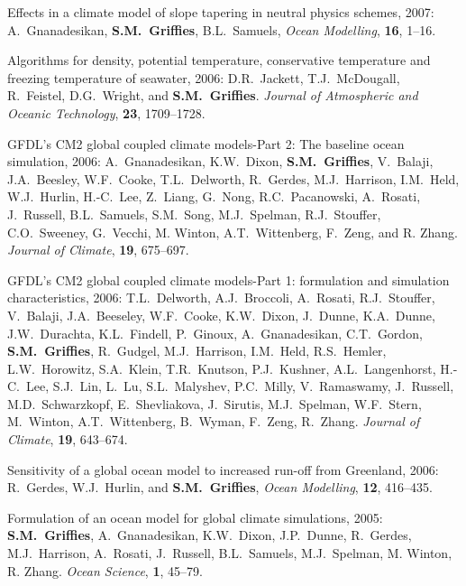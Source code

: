 \begin{etaremune}
\item Effects in a climate model of slope tapering in neutral physics
schemes, 2007: A.\ Gnanadesikan, {\bf S.M.\ Grif\/f\/ies}, B.L.\
Samuels, {\em Ocean Modelling}, {\bf 16}, 1--16.
  
\item Algorithms for density, potential temperature, conservative
  temperature and freezing temperature of seawater, 2006: D.R.\
  Jackett, T.J.\ McDougall, R.\ Feistel, D.G.\ Wright, and {\bf S.M.\
    Grif\/f\/ies}.  {\em Journal of Atmospheric and Oceanic
    Technology}, {\bf 23}, 1709--1728.

\item GFDL's CM2 global coupled climate models-Part 2: The baseline
  ocean simulation, 2006: A.\ Gnanadesikan, K.W.\ Dixon, {\bf S.M.\
    Griffies}, V.\ Balaji, J.A.\ Beesley, W.F.\ Cooke, T.L.\ Delworth,
  R.\ Gerdes, M.J.\ Harrison, I.M.\ Held, W.J.\ Hurlin, H.-C.\ Lee,
  Z.\ Liang, G.\ Nong, R.C.\ Pacanowski, A.\ Rosati, J.\ Russell,
  B.L.\ Samuels, S.M.\ Song, M.J.\ Spelman, R.J.\ Stouffer, C.O.\
  Sweeney, G.\ Vecchi, M. Winton, A.T.\ Wittenberg, F.\ Zeng, and
  R. Zhang.  {\em Journal of Climate}, {\bf 19}, 675--697.

\item GFDL's CM2 global coupled climate models-Part 1: formulation and
  simulation characteristics, 2006: T.L.\ Delworth, A.J.\ Broccoli,
  A.\ Rosati, R.J.\ Stouffer, V.\ Balaji, J.A.\ Beeseley, W.F.\ Cooke,
  K.W.\ Dixon, J.\ Dunne, K.A.\ Dunne, J.W.\ Durachta, K.L.\ Findell,
  P.\ Ginoux, A.\ Gnanadesikan, C.T.\ Gordon, {\bf S.M.\ Griffies},
  R.\ Gudgel, M.J.\ Harrison, I.M.\ Held, R.S.\ Hemler, L.W.\
  Horowitz, S.A.\ Klein, T.R.\ Knutson, P.J.\ Kushner, A.L.\
  Langenhorst, H.-C.\ Lee, S.J.\ Lin, L.\ Lu, S.L.\ Malyshev, P.C.\
  Milly, V.\ Ramaswamy, J.\ Russell, M.D.\ Schwarzkopf, E.\
  Shevliakova, J.\ Sirutis, M.J.\ Spelman, W.F.\ Stern, M.\ Winton,
  A.T.\ Wittenberg, B.\ Wyman, F.\ Zeng, R.\ Zhang.  {\em Journal of
    Climate}, {\bf 19}, 643--674.

\item Sensitivity of a global ocean model to increased run-off from
Greenland, 2006: R.\ Gerdes, W.J.\ Hurlin, and {\bf S.M.\ Griffies},
{\em Ocean Modelling}, {\bf 12}, 416--435.
  
\item Formulation of an ocean model for global climate simulations,
2005: {\bf S.M.\ Griffies}, A.\ Gnanadesikan, K.W.\ Dixon, J.P.\
Dunne, R.\ Gerdes, M.J.\ Harrison, A.\ Rosati, J.\ Russell, B.L.\
Samuels, M.J.\ Spelman, M. Winton, R. Zhang. {\em Ocean Science}, {\bf
1}, 45--79.


\end{etaremune}
